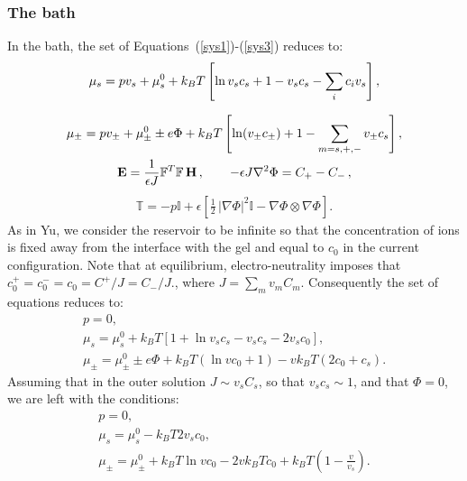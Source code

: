 \subsubsection{The bath}
In the bath, the set of Equations~(\ref{sys1})-(\ref{sys3}) reduces to:
\begin{gather}
\mu_s = p v_s + \mu_s^0 + k_BT\left[\ln v_s c_s+1-v_sc_s -\sum_i c_iv_s \right],\\[2.5mm]
\mu_\pm = p v_\pm + \mu^0_\pm \pm e\Phi + k_BT \left[\ln (v_\pm c_\pm)+1-\sum_{m=s,+,-}v_\pm c_s \right],\\
\mathbf{E} = \frac{1}{\epsilon J} \mathbb{F}^T \mathbb{F}\, \mathbf{H}\, , \qquad -\epsilon J \nabla^2 \Phi = C_+-C_-\, ,
\end{gather}
\begin{gather}
\mathbb{T}= -p \mathbb{I} + \epsilon \left[\frac{1}{2} \,|\nabla \Phi|^2\mathbb{I} -\nabla \Phi \otimes \nabla \Phi\right].
\end{gather} 
As in Yu, we consider the reservoir to be infinite so that the concentration of ions is fixed away from the interface with the gel and equal to $c_0$ in the current configuration. Note that at equilibrium, electro-neutrality imposes that $c_0^+=c_0^-=c_0=C^+/J=C_-/J.$, where $J=\sum_m v_m C_m$. Consequently the set of equations reduces to:
\begin{gather}
p=0,\\
\mu_s = \mu_s^0 + k_BT\left[1+\ln v_s c_s - v_s c_s -2v_sc_0 \right],\\
\mu_\pm =\mu^0_\pm \pm e\Phi + k_BT( \ln v c_0+1) - v k_BT (2c_0+c_s).
\end{gather} 
Assuming that in the outer solution $J\sim v_s C_s$, so that $v_s c_s\sim 1$, and that $\Phi=0$, we are left with the conditions:
\begin{gather}
p=0,\\
\mu_s = \mu_s^0 - k_BT2v_sc_0,\\
\mu_\pm =\mu^0_\pm + k_BT \ln v c_0 -2 v k_BTc_0+k_BT\left(1-\frac{v}{v_s}\right).
\end{gather} 
